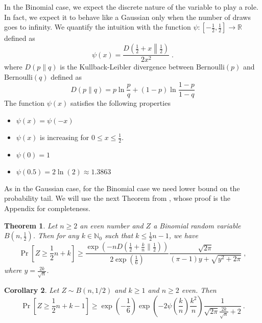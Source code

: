 \documentclass{article}
\newcommand{\field}[1]{\mathbb{#1}}
\newcommand{\R}{\field{R}}
\newcommand{\Nat}{\field{N}}
\newtheorem{theorem}{Theorem}
\newtheorem{corrollary}[theorem]{Corollary}
\begin{document}
In the Binomial case, we expect the discrete nature of the variable to play a
role. In fact, we expect it to behave like a Gaussian only when the number of
draws goes to infinity.  We quantify the intuition with the function $\psi:[-\frac{1}{2},\frac{1}{2}] \to \R$
defined as
$$
\psi(x) = \frac{D \left(\frac{1}{2}+x \middle\| \frac{1}{2} \right)}{2 x^2} \; .
$$
where $D(p\|q)$ is the Kullback-Leibler divergence between $\text{Bernoulli}(p)$ and $\text{Bernoulli}(q)$
defined as
$$
D(p\|q) = p \ln \frac{p}{q}+(1-p) \ln\frac{1-p}{1-q}
$$
The function $\psi(x)$ satisfies the following properties
\begin{itemize}
\item $\psi(x) = \psi(-x)$
\item $\psi(x)$ is increasing for $0\le x \le \frac{1}{2}$.
\item $\psi(0) = 1$
\item $\psi(0.5) = 2 \ln(2) \approx 1.3863$
\end{itemize}

As in the Gaussian case, for the Binomial case we need lower bound on the
probability tail.  We will use the next Theorem from \cite{nOrabona13}, whose
proof is the Appendix for completeness.

\begin{theorem}
\label{theorem:binomial}
Let $n \ge 2$ an even number and $Z$ a Binomial random variable
$B(n,\frac{1}{2})$. Then for any $k \in \Nat_0$ such that $k\le
\frac{1}{2}n-1$, we have
$$
\Pr \left[ Z \ge \frac{1}{2} n + k\right]
\ge \frac{\exp\left(-n D(\frac{1}{2}+\frac{k}{n}\|\frac{1}{2})\right)}{2 \exp\left(\frac{1}{6}\right)} \frac{\sqrt{2 \pi}}{(\pi-1)y+\sqrt{y^2+2 \pi}} \; ,
$$
where $y=\frac{2 k}{\sqrt{n}}$.
\end{theorem}

\begin{corrollary}
Let $Z \sim B(n, 1/2)$ and $k \ge 1$ and $n \ge 2$ even. Then
$$
\Pr \left[ Z \ge \frac{1}{2} n + k-1 \right] \ge \exp\left(-\frac{1}{6}\right) \exp\left(- 2 \psi\left(\frac{k}{n}\right) \frac{k^2}{n} \right) \frac{1}{\sqrt{2\pi} \frac{2 k}{\sqrt{n}} + 2 }~.
$$
\end{corrollary}
\end{document}
